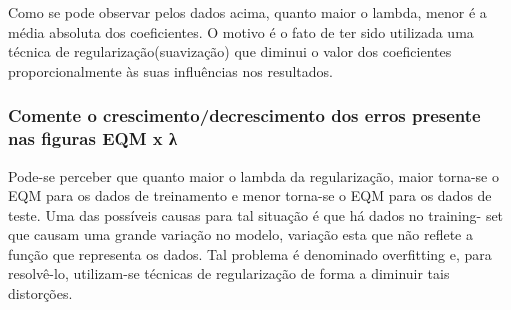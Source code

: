 \documentclass[letterpaper,10pt,english]{/usr/local/lib/python2.7/dist-packages/sphinx/texinputs/sphinxhowto}
\begin{document}
        
    

Como se pode observar pelos dados acima, quanto maior o lambda, menor
é a média absoluta dos coeficientes.
O motivo é o fato de ter sido utilizada uma técnica de
regularização(suavização) que diminui o valor dos coeficientes
proporcionalmente às suas influências nos resultados.
\subsubsection{Comente o crescimento/decrescimento dos erros presente nas figuras EQM x
λ}
Pode-se perceber que quanto maior o lambda da regularização, maior
torna-se o EQM para os dados de treinamento e menor torna-se o EQM
para os dados de teste.
Uma das possíveis causas para tal situação é que há dados no training-
set que causam uma grande variação no modelo, variação esta que não
reflete a função que representa os dados. Tal problema é denominado
overfitting e, para resolvê-lo, utilizam-se técnicas de regularização
de forma a diminuir tais distorções.

        

        \renewcommand{\indexname}{Index}
        \printindex

    
\end{document}
